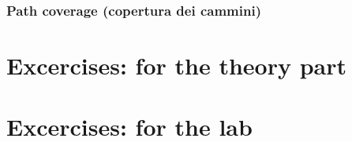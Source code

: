 \documentclass{article}
\begin{document}
\subsubsection{Path coverage (copertura dei cammini)}


\newpage

\section{Excercises: for the theory part}

\section{Excercises: for the lab}

\clearpage







\nocite{*}
\end{document}
